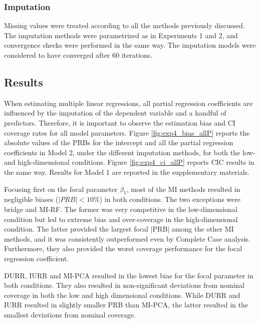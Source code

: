 \subsubsection{Imputation}
	
	Missing values were treated according to all the methods previously discussed.
	The imputation methods were parametrized as in Experiments 1 and 2, and
	convergence checks were performed in the same way.
	The imputation models were considered to have converged after 60 iterations.

\subsection{Results}

	When estimating multiple linear regressions, all partial regression coefficients are influenced by the 
	imputation of the dependent variable and a handful of predictors.
	Therefore, it is important to observe the estimation bias and CI coverage rates for all model parameters.
	Figure \ref{fig:exp4_bias_allP} reports the absolute values of the PRBs for the intercept and all the partial 
	regression coefficients in Model 2, under the different imputation methods, for both the low- and high-dimensional
	conditions.
	Figure \ref{fig:exp4_ci_allP} reports CIC results in the same way.
	Results for Model 1 are reported in the supplementary materials.

	Focusing first on the focal parameter $\beta_1$, most of the MI methods resulted in negligible biases ($| PRB | < 10\%$) 
	in both conditions.
	The two exceptions were bridge and MI-RF. 
	The former was very competitive in the low-dimensional condition but led to extreme bias and over-coverage in the 
	high-dimensional condition.
	The latter provided the largest focal $|\text{PRB}|$ among the other MI methods, and it was consistently 
	outperformed even by Complete Case analysis.
	Furthermore, they also provided the worst coverage performance for the focal regression coefficient.

	DURR, IURR and MI-PCA resulted in the lowest bias for the focal parameter in both conditions.
	They also resulted in non-significant deviations from nominal coverage in both the low and high
	dimensional conditions.
	While DURR and IURR resulted in slightly smaller PRB than MI-PCA, the latter resulted in the smallest 
	deviations from nominal coverage.

